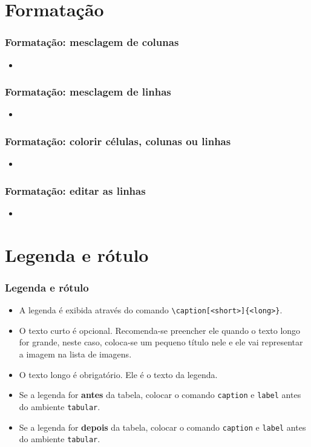 \documentclass[brazilian]{beamer}
\begin{document}
\section{Formatação}
\begin{frame}[fragile]
  \frametitle{Formatação: mesclagem de colunas}

  \begin{itemize}
    \item 
  \end{itemize}

\end{frame}
\begin{frame}[fragile]
  \frametitle{Formatação: mesclagem de linhas}

  \begin{itemize}
    \item 
  \end{itemize}

\end{frame}
\begin{frame}[fragile]
  \frametitle{Formatação: colorir células, colunas ou linhas}

  \begin{itemize}
    \item 
  \end{itemize}

\end{frame}
\begin{frame}[fragile]
  \frametitle{Formatação: editar as linhas}

  \begin{itemize}
    \item 
  \end{itemize}

\end{frame}

\section{Legenda e rótulo}
\begin{frame}[fragile]
  \frametitle{Legenda e rótulo}

  \begin{itemize}
    \item A legenda é exibida através do comando \lstinline[style=myStyleLatex]!\caption[<short>]{<long>}!.
    \item O texto curto é opcional. Recomenda-se preencher ele quando o texto longo for grande, neste caso, coloca-se um pequeno título nele e ele vai representar a imagem na lista de imagens.
    \item O texto longo é obrigatório. Ele é o texto da legenda.
    \item Se a legenda for \textbf{antes} da tabela, colocar o comando \texttt{caption} e \texttt{label} antes do ambiente \texttt{tabular}.
    \item Se a legenda for \textbf{depois} da tabela, colocar o comando \texttt{caption} e \texttt{label} antes do ambiente \texttt{tabular}.
  \end{itemize}

\end{frame}
\end{document}
